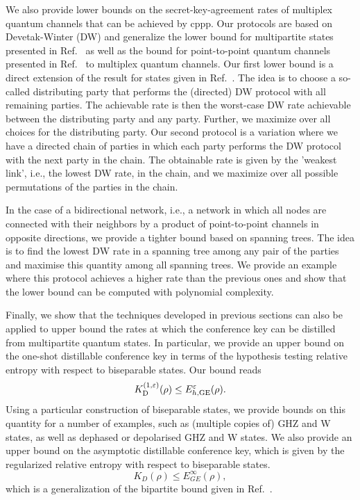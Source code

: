 \documentclass[aps,pra,twocolumn,superscriptaddress,longbibliography]{revtex4-1}
\def\GE{\operatorname{GE}}
\begin{document}
We also provide lower bounds on the secret-key-agreement rates of multiplex quantum channels that can be achieved by cppp. Our protocols are based on Devetak-Winter (DW) \cite{DW05} and generalize the lower bound for multipartite states presented in Ref.~\cite{AH09} as well as the bound for point-to-point quantum channels presented in Ref.~\cite{pirandola2009direct} to multiplex quantum channels. Our first lower bound is a direct extension of the result for states given in Ref.~\cite{AH09}. The idea is to choose a so-called distributing party that performs the (directed) DW protocol with all remaining parties. The achievable rate is then the worst-case DW rate achievable between the distributing party and any party. Further, we maximize over all choices for the distributing party. Our second protocol is a variation where we have a directed chain of parties in which each party performs the DW protocol with the next party in the chain. The obtainable rate is given by the 'weakest link', i.e., the lowest DW rate, in the chain, and we maximize over all possible permutations of the parties in the chain. 

In the case of a bidirectional network, i.e., a network in which all nodes are connected with their neighbors by a product of point-to-point channels in opposite directions, we provide a tighter bound based on spanning trees. The idea is to find the lowest DW rate in a spanning tree among any pair of the parties and maximise this quantity among all spanning trees. We provide an example where this protocol achieves a higher rate than the previous ones and show that the lower bound can be computed with polynomial complexity. 



Finally, we show that the techniques developed in previous sections can also be applied to upper bound the rates at which the conference key can be distilled from multipartite quantum states. In particular, we provide an upper bound on the one-shot distillable conference key in terms of the hypothesis testing relative entropy with respect to biseparable states. Our bound reads
\begin{equation}
      K_{\textnormal{D}}^{(1,\varepsilon)}(\rho)\leq E^\varepsilon_{h,\GE}(\rho).
\end{equation}
Using a particular construction of biseparable states, we provide bounds on this quantity for a number of examples, such as (multiple copies of) GHZ and W states, as well as dephased or depolarised GHZ and W states. We also provide an upper bound on the asymptotic distillable conference key, which is given by the regularized relative entropy with respect to biseparable states.
\begin{equation}
    K_D(\rho)\leq E^\infty_{GE}(\rho),
\end{equation}
which is a generalization of the bipartite bound given in Ref.~\cite{HHHO09}.
\end{document}
